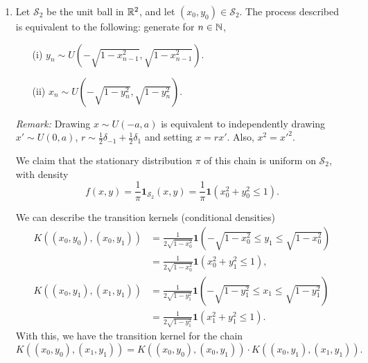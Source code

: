 \documentclass[11pt]{article}
\begin{document}
\begin{enumerate}
        \item Let $\mathcal{S}_2$ be the unit ball in $\mathbb{R}^2$, and let $(x_0,
        y_0) \in \mathcal{S}_2$.
        The process described is equivalent to the following: generate for $n \in \mathbb{N}$,
        \begin{enumerate}
            \item[(i)] $y_n \sim U(-\sqrt{1 - x_{n - 1}^2}, \sqrt{1 - x_{n - 1}^2})$.
            \item[(ii)] $x_n \sim U(-\sqrt{1 - y_n^2}, \sqrt{1 - y_n^2})$.
        \end{enumerate}
        \emph{Remark:} Drawing $x \sim U(-a, a)$ is equivalent to independently
        drawing $x' \sim U(0, a)$, $r \sim \frac{1}{2}\delta_{-1} +
        \frac{1}{2}\delta_{1}$ and setting $x = rx'$.
        Also, $x^2 = x'^2$.


        We claim that the stationary distribution $\pi$ of this chain is
        uniform on $\mathcal{S}_2$, with density \[
            f(x, y)
                = \frac{1}{\pi} \bm{1}_{\mathcal{S}_2}(x, y)
                = \frac{1}{\pi} \bm{1}\left(x_0^2 + y_0^2 \leq 1\right).
        \]

        We can describe the transition kernels (conditional densities) \begin{align*}
            K((x_0, y_0), (x_0, y_1))
                &= \frac{1}{2\sqrt{1 - x_0^2}} \bm{1}\left(-\sqrt{1 - x_0^2} \leq y_1 \leq \sqrt{1 - x_0^2}\right) \\
                &= \frac{1}{2\sqrt{1 - x_0^2}} \bm{1}\left(x_0^2 + y_1^2 \leq 1\right), \\
            K((x_0, y_1), (x_1, y_1))
                &= \frac{1}{2\sqrt{1 - y_1^2}} \bm{1}\left(-\sqrt{1 - y_1^2} \leq x_1 \leq \sqrt{1 - y_1^2}\right) \\
                &= \frac{1}{2\sqrt{1 - y_1^2}} \bm{1}\left(x_1^2 + y_1^2 \leq 1\right).
        \end{align*}
        With this, we have the transition kernel for the chain \[
            K((x_0, y_0), (x_1, y_1))
                = K((x_0, y_0), (x_0, y_1)) \cdot K((x_0, y_1), (x_1, y_1)).
        \]


\end{enumerate}
\end{document}
